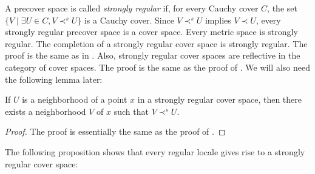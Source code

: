 \documentclass[reqno]{amsart}
\theoremstyle{definition}
\theoremstyle{remark}
\numberwithin{figure}{section}
\newcommand{\rb}{\prec}
\begin{document}
A precover space is called \emph{strongly regular} if, for every Cauchy cover $C$, the set $\{ V \mid \exists U \in C, V \rb^s U \}$ is a Cauchy cover.
Since $V \rb^s U$ implies $V \rb U$, every strongly regular precover space is a cover space.
Every metric space is strongly regular.
The completion of a strongly regular cover space is strongly regular.
The proof is the same as in .
Also, strongly regular cover spaces are reflective in the category of cover spaces.
The proof is the same as the proof of .
We will also need the following lemma later:

\begin{lem}
If $U$ is a neighborhood of a point $x$ in a strongly regular cover space, then there exists a neighborhood $V$ of $x$ such that $V \rb^s U$.
\end{lem}
\begin{proof}
The proof is essentially the same as the proof of .
\end{proof}

The following proposition shows that every regular locale gives rise to a strongly regular cover space:
\end{document}
